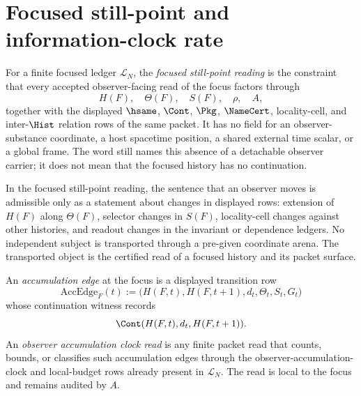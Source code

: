 \section{Focused still-point and information-clock rate}
\label{sec:consciousness-universe-focused-still-point-clock-rate}

\begin{definition}
\label{def:consciousness-universe-focused-still-point-reading}
For a finite focused ledger $\mathcal{L}_N$, the \emph{focused still-point reading} is the constraint that every accepted observer-facing read of the focus factors through
$$
H(F),\quad \Theta(F),\quad S(F),\quad \rho,\quad A,
$$
together with the displayed $\hsame$, $\Cont$, $\Pkg$, $\NameCert$, locality-cell, and inter-$\Hist$ relation rows of the same packet. It has no field for an observer-substance coordinate, a host spacetime position, a shared external time scalar, or a global frame. The word still names this absence of a detachable observer carrier; it does not mean that the focused history has no continuation.
\end{definition}

\begin{principle}
\label{prin:consciousness-universe-motion-as-record-change}
In the focused still-point reading, the sentence that an observer moves is admissible only as a statement about changes in displayed rows: extension of $H(F)$ along $\Theta(F)$, selector changes in $S(F)$, locality-cell changes against other histories, and readout changes in the invariant or dependence ledgers. No independent subject is transported through a pre-given coordinate arena. The transported object is the certified read of a focused history and its packet surface.
\end{principle}

\begin{definition}
\label{def:consciousness-universe-accumulation-edge-clock-read}
An \emph{accumulation edge} at the focus is a displayed transition row
$$
\mathrm{AccEdge}_{F}(t)
:=
\bigl(H(F,t),H(F,t+1),d_t,\Theta_t,S_t,G_t\bigr)
$$
whose continuation witness records
$$
\Cont(H(F,t),d_t,H(F,t+1)).
$$
An \emph{observer accumulation clock read} is any finite packet read that counts, bounds, or classifies such accumulation edges through the observer-accumulation-clock and local-budget rows already present in $\mathcal{L}_N$. The read is local to the focus and remains audited by $A$.
\end{definition}

